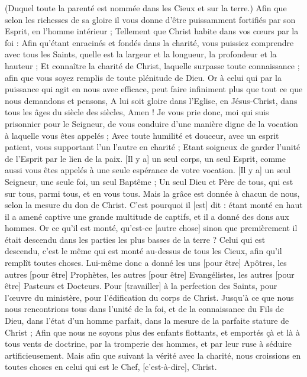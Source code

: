 \begin{multicols}{2}
(Duquel toute la parenté est nommée dans les Cieux et sur la terre.)
Afin que selon les richesses de sa gloire il vous donne d'être puissamment fortifiés par son Esprit, en l'homme intérieur ;
Tellement que Christ habite dans vos cœurs par la foi :
Afin qu'étant enracinés et fondés dans la charité, vous puissiez comprendre avec tous les Saints, quelle est la largeur et la longueur, la profondeur et la hauteur ;
Et connaître la charité de Christ, laquelle surpasse toute connaissance ; afin que vous soyez remplis de toute plénitude de Dieu.
Or à celui qui par la puissance qui agit en nous avec efficace, peut faire infiniment plus que tout ce que nous demandons et pensons,
A lui soit gloire dans l'Eglise, en Jésus-Christ, dans tous les âges du siècle des siècles, Amen !
\VerseOne{} Je vous prie donc, moi qui suis prisonnier pour le Seigneur, de vous conduire d'une manière digne de la vocation à laquelle vous êtes appelés ;
Avec toute humilité et douceur, avec un esprit patient, vous supportant l'un l'autre en charité ;
Etant soigneux de garder l'unité de l'Esprit par le lien de la paix.
[Il y a] un seul corps, un seul Esprit, comme aussi vous êtes appelés à une seule espérance de votre vocation.
[Il y a] un seul Seigneur, une seule foi, un seul Baptême ;
Un seul Dieu et Père de tous, qui est sur tous, parmi tous, et en vous tous.
Mais la grâce est donnée à chacun de nous, selon la mesure du don de Christ.
C'est pourquoi il [est] dit : étant monté en haut il a amené captive une grande multitude de captifs, et il a donné des dons aux hommes.
Or ce qu'il est monté, qu'est-ce [autre chose] sinon que premièrement il était descendu dans les parties les plus basses de la terre ?
Celui qui est descendu, c'est le même qui est monté au-dessus de tous les Cieux, afin qu'il remplît toutes choses.
Lui-même donc a donné les uns [pour être] Apôtres, les autres [pour être] Prophètes, les autres [pour être] Evangélistes, les autres [pour être] Pasteurs et Docteurs.
Pour [travailler] à la perfection des Saints, pour l’œuvre du ministère, pour l'édification du corps de Christ.
Jusqu'à ce que nous nous rencontrions tous dans l'unité de la foi, et de la connaissance du Fils de Dieu, dans l'état d'un homme parfait, dans la mesure de la parfaite stature de Christ ;
Afin que nous ne soyons plus des enfants flottants, et emportés çà et là à tous vents de doctrine, par la tromperie des hommes, et par leur ruse à séduire artificieusement.
Mais afin que suivant la vérité avec la charité, nous croissions en toutes choses en celui qui est le Chef, [c'est-à-dire], Christ.

\end{multicols}
